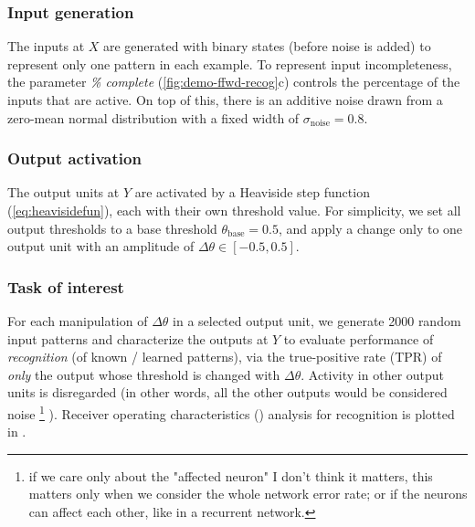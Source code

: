 \subsubsection*{Input generation}

The inputs at $X$ are generated with binary states (before noise is added)
        to represent only one pattern in each example.
    To represent input incompleteness, the parameter \textit{\% complete}
        (\autoref{fig:demo-ffwd-recog}c)
        controls the percentage of the inputs that are active.
    On top of this, there is an additive noise
        drawn from a zero-mean normal distribution
        with a fixed width of $\sigma_{\text{noise}} = 0.8$.

\subsubsection*{Output activation}

The output units at $Y$ are activated by a Heaviside step function (\autoref{eq:heavisidefun}),
    each with their own threshold value.
    For simplicity, we set all output thresholds
        to a base threshold $\theta_{\text{base}} = 0.5$,
        and apply a change only to one output unit with an amplitude of $\Delta \theta \in [-0.5,0.5]$.

\subsubsection*{Task of interest}

For each manipulation of $\Delta \theta$ in a selected output unit,
        we generate 2000 random input patterns
        and characterize the outputs at $Y$ to evaluate performance of \textit{recognition} (of known / learned patterns),
        via the true-positive rate (TPR) of \textit{only} the output whose threshold is changed with $\Delta \theta$.
    Activity in other output units is disregarded
        (in other words, all the other outputs would be considered noise
        \footnote{if we care only about the "affected neuron" I don't think it matters, this matters only when we consider the whole network error rate; or if the neurons can affect each other, like in a recurrent network.}
        ).
    Receiver operating characteristics
        ()
        analysis for recognition is plotted in
            .

